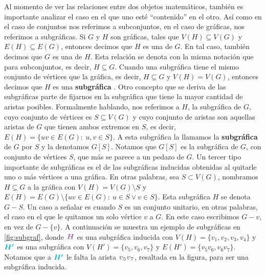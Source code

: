 Al momento de ver las relaciones entre dos objetos matem\'aticos, tambi\'en es
importante analizar el caso en el que uno est\'e ``contenido'' en el otro. As\'i
como en el caso de conjuntos nos referimos a subconjuntos, en el caso de
gr\'aficas, nos referimos a subgr\'aficas. Si $G$ y $H$ son gr\'aficas, tales
que $V(H) \subseteq V(G)$ y $E(H) \subseteq E(G)$, entonces decimos que $H$ es
una  de $G$. En tal caso, tambi\'en decimos que $G$ es una
 de $H$. Esta relaci\'on se denota con la misma
notaci\'on que para subconjuntos, es decir, $H \subseteq G$. Cuando una
subgr\'afica tiene el mismo conjunto de v\'ertices que la gr\'afica, es decir,
$H \subseteq G$ y $V(H)= V(G)$, entonces decimos que $H$ es una
\textbf{subgr\'afica} . Otro concepto que se
deriva de las subgr\'aficas parte de fijarnos en la subgr\'afica que tiene la
mayor cantidad de aristas posibles. Formalmente hablando, nos referimos a $H$,
la subgr\'afica de $G$, cuyo conjunto de v\'ertices es $S \subseteq V(G)$ y cuyo
conjunto de aristas son aquellas aristas de $G$ que tienen ambos extremos en
$S$, es decir, $E(H) = \{uv \in E(G) \colon\ u,v \in S\}$. A esta subgr\'afica
la llamamos la \textbf{subgr\'afica}  de $G$
por $S$ y la denotamos $G[S]$. Notamos que $G[S]$ es la subgr\'afica de $G$, con
conjunto de v\'ertices $S$, que m\'as se parece a un pedazo de $G$. Un tercer
tipo importante de subgr\'aficas es el de las subgr\'aficas inducidas obtenidas
al quitarle uno o m\'as v\'ertices a una gr\'afica. En otras palabras, sea $S
\subset V(G)$, nombramos $H \subseteq G$ a la gr\'afica con $V(H)=V(G) \setminus
S$ y $E(H) = E(G)\setminus\{uv \in E(G) \colon\ u \in S \lor v \in S\}$. Esta
subgr\'afica $H$ se denota $G-S$. Un caso a se\~{n}alar es cuando $S$ es un
conjunto unitario, en otras palabras, el caso en el que le quitamos un solo v\'ertice $v$ a
$G$. En este caso escribimos $G-v$, en vez de $G-\{v\}$. A continuaci\'on se
muestra un ejemplo de subgr\'aficas en \cref{fig:subgraf}, donde
${\color{morado}\boldsymbol {H}}$ es una subgr\'afica inducida con $V(H) =
\{v_1,v_2,v_3,v_4\}$ y ${\color{azulCielo}{\boldsymbol{ H'}}}$ es una
subgr\'afica con $V(H')=\{v_5,v_6,v_7\}$ y $E(H')=\{v_5v_6,  v_6v_7\}$. Notamos
que a ${\color{azulCielo}\boldsymbol {H'}}$ le falta la arista
${\color{grisOscuro!80}\boldsymbol {v_5v_7}}$, resaltada en la figura, para ser
una subgr\'afica inducida. 

